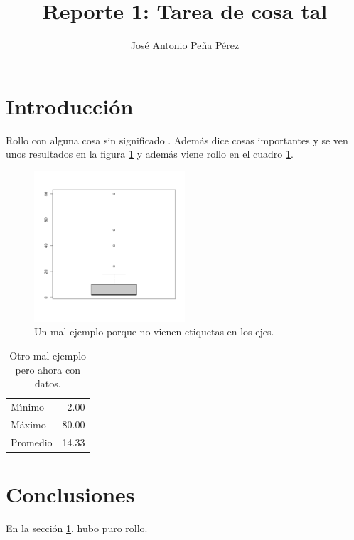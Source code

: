 \documentclass{article}
\title{Reporte 1: Tarea de cosa tal}
\author{Jos\'{e} Antonio Pe\~{n}a P\'{e}rez}
\begin{document}
\maketitle

\section{Introducci\'{o}n}\label{intro}

Rollo con alguna cosa sin significado \citep{libro}.
Adem\'{a}s \citet{art} dice cosas importantes y se ven unos resultados
en la figura \ref{fig} y adem\'{a}s viene rollo en el cuadro \ref{datos}.

\begin{figure}
  \centering\includegraphics[width=0.5\textwidth]{demo.png}
  \caption{Un mal ejemplo porque no vienen etiquetas en los ejes.}
  \label{fig}
\end{figure}

\begin{table}
  \caption{Otro mal ejemplo pero ahora con datos.}
  \label{datos}
  \begin{center}
    \begin{tabular}{lr}
      M\'{\i}nimo & 2.00 \\
      M\'{a}ximo & 80.00 \\
      Promedio & 14.33
    \end{tabular}
  \end{center}
\end{table}


\section{Conclusiones}

En la secci\'{o}n \ref{intro}, hubo puro rollo.



\end{document}
